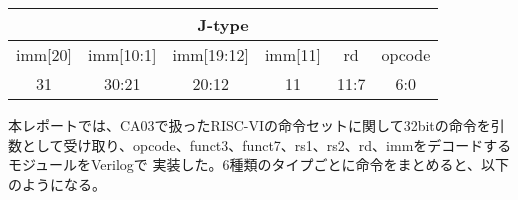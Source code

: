 \documentclass{jlreq}
\begin{document}
\vspace{0.5cm}

\begin{center}
    \begin{tabular}{|*{32}{c|}}
        \hline
        \multicolumn{32}{|c|}{J-type} \\
        \hline
        \multicolumn{1}{|c|}{imm[20]} & \multicolumn{10}{c|}{imm[10:1]} & \multicolumn{8}{c|}{imm[19:12]} & \multicolumn{1}{c|}{imm[11]} & \multicolumn{5}{c|}{rd} & \multicolumn{7}{c|}{opcode} \\
        \hline
        \multicolumn{1}{|c|}{31} & \multicolumn{10}{c|}{30:21} & \multicolumn{8}{c|}{20:12} & \multicolumn{1}{c|}{11} & \multicolumn{5}{c|}{11:7} & \multicolumn{7}{c|}{6:0} \\
        \hline
    \end{tabular}
\end{center}

\vspace{0.5cm}

本レポートでは、CA03で扱ったRISC-VIの命令セットに関して32bitの命令を引数として受け取り、opcode、funct3、funct7、rs1、rs2、rd、immをデコードするモジュールをVerilogで
実装した。6種類のタイプごとに命令をまとめると、以下のようになる。
\end{document}
